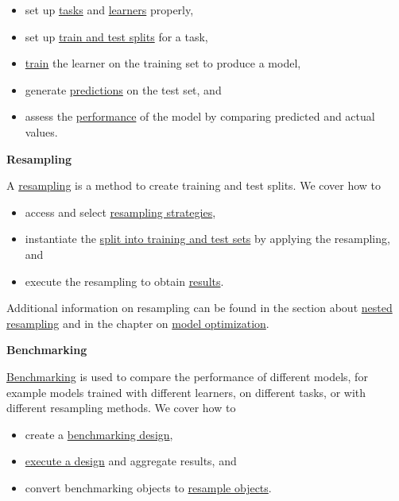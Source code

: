 \documentclass[]{article}
\providecommand{\tightlist}{%
  \setlength{\itemsep}{0pt}\setlength{\parskip}{0pt}}
\begin{document}
\begin{itemize}
\tightlist
\item
  set up \protect\hyperlink{train-predict-objects}{tasks} and \protect\hyperlink{train-predict-objects}{learners} properly,
\item
  set up \protect\hyperlink{split-data}{train and test splits} for a task,
\item
  \protect\hyperlink{training}{train} the learner on the training set to produce a model,
\item
  generate \protect\hyperlink{predicting}{predictions} on the test set, and
\item
  assess the \protect\hyperlink{measure}{performance} of the model by comparing predicted and actual values.
\end{itemize}

\textbf{Resampling}

A \protect\hyperlink{resampling}{resampling} is a method to create training and test splits.
We cover how to

\begin{itemize}
\tightlist
\item
  access and select \protect\hyperlink{resampling-settings}{resampling strategies},
\item
  instantiate the \protect\hyperlink{resampling-inst}{split into training and test sets} by applying the resampling, and
\item
  execute the resampling to obtain \protect\hyperlink{resampling-exec}{results}.
\end{itemize}

Additional information on resampling can be found in the section about \protect\hyperlink{nested-resampling}{nested resampling} and in the chapter on \protect\hyperlink{model-optim}{model optimization}.

\textbf{Benchmarking}

\protect\hyperlink{benchmarking}{Benchmarking} is used to compare the performance of different models, for example models trained with different learners, on different tasks, or with different resampling methods.
We cover how to

\begin{itemize}
\tightlist
\item
  create a \protect\hyperlink{bm-design}{benchmarking design},
\item
  \protect\hyperlink{bm-exec}{execute a design} and aggregate results, and
\item
  convert benchmarking objects to \protect\hyperlink{bm-resamp}{resample objects}.
\end{itemize}
\end{document}
